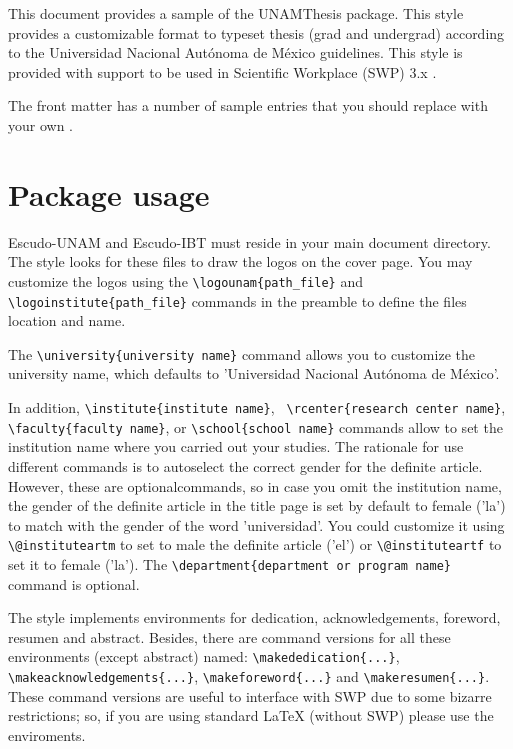 \documentclass[11pt,spanish]{report}
\begin{document}
This document provides a sample of the UNAMThesis package. This style provides a
customizable format to typeset thesis (grad and undergrad) according to the Universidad
Nacional Aut\'{o}noma de M\'{e}xico guidelines. This style is provided with support to be
used in Scientific Workplace (SWP) 3.x \citep{Barabasi2002,Freyre-Gonzalez2008,
Freyre-Gonzalez2005}.

The front matter has a number of sample entries that you should replace with
your own \citep{Gottesman1984,Griffith2002,Hartwell1999}.

\section{Package usage}
Escudo-UNAM and Escudo-IBT must reside in your main document directory. The style looks
for these files to draw the logos on the cover page. You may customize the logos using
the \texttt{\textbackslash{}logounam\{path\_file\}} and
\texttt{\textbackslash{}logoinstitute\{path\_file\}} commands in the preamble to define
the files location and name.

The \texttt{\textbackslash{}university\{university name\}} command allows you to customize
the university name, which defaults to 'Universidad Nacional Aut\'{o}noma de M\'{e}xico'.

In addition, \texttt{\textbackslash{}institute\{institute name\}}, \texttt{
\textbackslash{}rcenter\{research center name\}},
\texttt{\textbackslash{}faculty\{faculty name\}}, or
\texttt{\textbackslash{}school\{school name\}} commands allow to set the institution name
where you carried out your studies. The rationale for use different commands is to
autoselect the correct gender for the definite article. However, these are optionalcommands,
so in case you omit the institution name, the gender of the definite article in the title
page is set by default to female ('la') to match with the gender of the word 'universidad'.
You could customize it using \texttt{\textbackslash{}@instituteartm} to set to male the
definite article ('el') or \texttt{\textbackslash{}@instituteartf} to set it to female
('la'). The \texttt{\textbackslash{}department\{department or program name\}} command is
optional.

The style implements environments for dedication, acknowledgements, foreword, resumen and
abstract. Besides, there are command versions for all these environments (except abstract)
named: \texttt{\textbackslash{}makededication\{...\}},
\texttt{\textbackslash{}makeacknowledgements\{...\}},
\texttt{\textbackslash{}makeforeword\{...\}} and
\texttt{\textbackslash{}makeresumen\{...\}}. These command versions are useful to interface
with SWP due to some bizarre restrictions; so, if you are using standard LaTeX (without SWP)
please use the enviroments.
\end{document}
